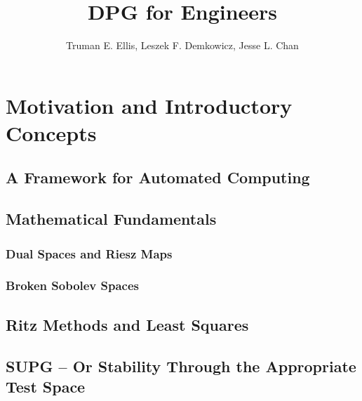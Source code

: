 \documentclass{article}
\title{DPG for Engineers}
\author{Truman E. Ellis, Leszek F. Demkowicz, Jesse L. Chan}
\begin{document}
\maketitle

\section{Motivation and Introductory Concepts}

\subsection{A Framework for Automated Computing}

\subsection{Mathematical Fundamentals}

\subsubsection{Dual Spaces and Riesz Maps}

\subsubsection{Broken Sobolev Spaces}

\subsection{Ritz Methods and Least Squares}

\subsection{SUPG -- Or Stability Through the Appropriate Test Space}
\end{document}
